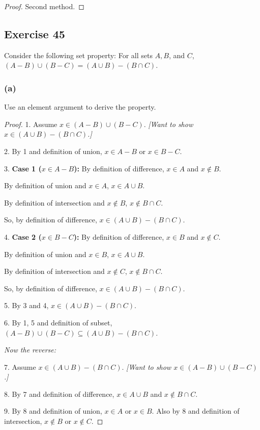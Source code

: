 \documentclass[14pt]{extarticle}
\begin{document}
\begin{proof}
  Second method.
\end{proof}

\subsection{Exercise 45}
Consider the following set property: For all sets $A, B$, and $C$, \((A - B) \cup (B - C) = (A \cup B) - (B \cap C)\).

\subsubsection{(a)}
Use an element argument to derive the property.

\begin{proof}
  1. Assume \(x \in (A - B) \cup (B - C)\). {\it [Want to show \(x \in (A \cup B) - (B \cap C)\).]}

  2. By 1 and definition of union, \(x \in A - B\) or \(x \in B - C\).

  3. {\bf Case 1 (\(x \in A - B\)):} By definition of difference, $x \in A$ and $x \notin B$.

  By definition of union and \(x \in A\), \(x \in A \cup B\).

  By definition of intersection and \(x \notin B\), \(x \notin B \cap C\).

  So, by definition of difference, \(x \in (A \cup B) - (B \cap C)\).

  4. {\bf Case 2 (\(x \in B - C\)):} By definition of difference, $x \in B$ and $x \notin C$.

  By definition of union and \(x \in B\), \(x \in A \cup B\).

  By definition of intersection and \(x \notin C\), \(x \notin B \cap C\).

  So, by definition of difference, \(x \in (A \cup B) - (B \cap C)\).

  5. By 3 and 4, \(x \in (A \cup B) - (B \cap C)\).

  6. By 1, 5 and definition of subset, \((A - B) \cup (B - C) \subseteq (A \cup B) - (B \cap C)\).

    {\it Now the reverse:}

  7. Assume \(x \in (A \cup B) - (B \cap C)\). {\it [Want to show \(x \in (A - B) \cup (B - C)\).]}

  8. By 7 and definition of difference, \(x \in A \cup B\) and \(x \notin B \cap C\).

  9. By 8 and definition of union, \(x \in A\) or \(x \in B\). Also by 8 and definition of intersection,
  \(x \notin B\) or \(x \notin C\).


\end{proof}
\end{document}

